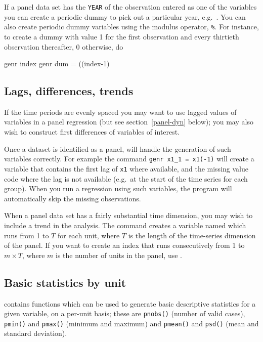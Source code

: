 If a panel data set has the \verb+YEAR+ of the observation entered as
one of the variables you can create a periodic dummy to pick out a
particular year, e.g.\ .  You can also
create periodic dummy variables using the modulus operator,
\verb+%+.  For instance, to create a dummy with
value 1 for the first observation and every thirtieth observation
thereafter, 0 otherwise, do
%
\begin{code}
genr index 
genr dum = ((index-1) %
\end{code}

\subsection{Lags, differences, trends}
\label{panel-lagged}

If the time periods are evenly spaced you may want to use lagged
values of variables in a panel regression (but see
section~\ref{panel-dyn} below); you may also wish to construct first
differences of variables of interest.

Once a dataset is identified as a panel,  will handle the
generation of such variables correctly.  For example the command
\verb+genr x1_1 = x1(-1)+ will create a variable that contains the
first lag of \verb+x1+ where available, and the missing value code
where the lag is not available (e.g.\ at the start of the time series
for each group).  When you run a regression using such variables, the
program will automatically skip the missing observations.

When a panel data set has a fairly substantial time dimension, you may
wish to include a trend in the analysis.  The command  
creates a variable named  which runs from 1 to $T$ for
each unit, where $T$ is the length of the time-series dimension of the
panel.  If you want to create an index that runs consecutively from 1
to $m\times T$, where $m$ is the number of units in the panel, use
.

\subsection{Basic statistics by unit}
\label{panel-stats}

 contains functions which can be used to generate basic
descriptive statistics for a given variable, on a per-unit basis;
these are \texttt{pnobs()} (number of valid cases), \texttt{pmin()}
and \texttt{pmax()} (minimum and maximum) and \texttt{pmean()} and
\texttt{psd()} (mean and standard deviation).

